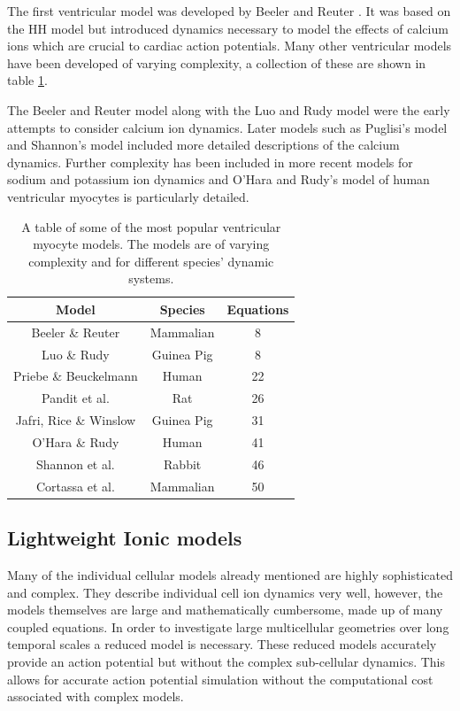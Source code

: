The first ventricular model was developed by Beeler and Reuter \citep{beelerreuter}. It was based on the HH model but introduced dynamics necessary to model the effects of calcium ions which are crucial to cardiac action potentials. Many other ventricular models have been developed of varying complexity, a collection of these are shown in table \ref{ventmodletable}. \par

The Beeler and Reuter model along with the Luo and Rudy model were the early attempts to consider calcium ion dynamics. Later models such as Puglisi's model and Shannon's model included more detailed descriptions of the calcium dynamics. Further complexity has been included in more recent models for sodium and potassium ion dynamics and O'Hara and Rudy's model of human ventricular myocytes is particularly detailed.

\begin{table}[h!]
\centering
    \begin{tabular}{||c c c||} 
        \hline
        Model & Species & Equations \\ [0.5ex] 
        \hline\hline
        Beeler \& Reuter \citep{beelerreuter} & Mammalian & 8 \\
        \hline
        Luo \& Rudy \citep{luorudy} & Guinea Pig & 8 \\
        \hline
        Priebe \& Beuckelmann \citep{priebe} & Human & 22 \\
        \hline
        Pandit et al. \citep{pandit} & Rat & 26 \\
        \hline
        Jafri, Rice \& Winslow \citep{JRW} & Guinea Pig & 31 \\
        \hline
        O'Hara \& Rudy \citep{ohararudy} & Human & 41 \\
        \hline
        Shannon et al. \citep{shannon} & Rabbit & 46 \\
        \hline
        Cortassa et al. \citep{cortassa} & Mammalian & 50 \\
        \hline
    \end{tabular}
\caption{A table of some of the most popular ventricular myocyte models. The models are of varying complexity and for different species' dynamic systems.}
\label{ventmodletable}
\end{table}

\subsection{Lightweight Ionic models}
Many of the individual cellular models already mentioned are highly sophisticated and complex. They describe individual cell ion dynamics very well, however, the models themselves are large and mathematically cumbersome, made up of many coupled equations. In order to investigate large multicellular geometries over long temporal scales a reduced model is necessary. These reduced models accurately provide an action potential but without the complex sub-cellular dynamics. This allows for accurate action potential simulation without the computational cost associated with complex models.
